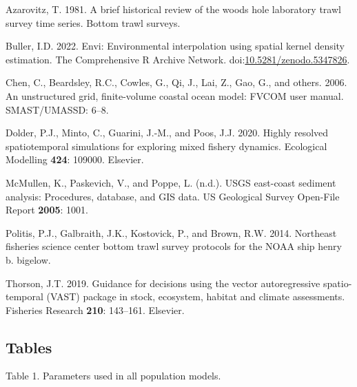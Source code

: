 \documentclass[
  12pt,
]{article}
\newlength{\cslhangindent}
\newlength{\cslentryspacingunit} %
\newenvironment{CSLReferences}[2] %
 {%
  \setlength{\parindent}{0pt}
  \ifodd #1
  \let\oldpar\par
  \def\par{\hangindent=\cslhangindent\oldpar}
  \fi
  \setlength{\parskip}{#2\cslentryspacingunit}
 }%
 {}
\begin{document}
\hypertarget{refs}{}
\begin{CSLReferences}{1}{0}
\leavevmode{}%
Azarovitz, T. 1981. A brief historical review of the woods hole laboratory trawl survey time series. Bottom trawl surveys.

\leavevmode{}%
Buller, I.D. 2022. Envi: Environmental interpolation using spatial kernel density estimation. The Comprehensive R Archive Network. doi:\href{https://doi.org/10.5281/zenodo.5347826}{10.5281/zenodo.5347826}.

\leavevmode{}%
Chen, C., Beardsley, R.C., Cowles, G., Qi, J., Lai, Z., Gao, G., and others. 2006. An unstructured grid, finite-volume coastal ocean model: FVCOM user manual. SMAST/UMASSD: 6--8.

\leavevmode{}%
Dolder, P.J., Minto, C., Guarini, J.-M., and Poos, J.J. 2020. Highly resolved spatiotemporal simulations for exploring mixed fishery dynamics. Ecological Modelling \textbf{424}: 109000. Elsevier.

\leavevmode{}%
McMullen, K., Paskevich, V., and Poppe, L. (n.d.). USGS east-coast sediment analysis: Procedures, database, and GIS data. US Geological Survey Open-File Report \textbf{2005}: 1001.

\leavevmode{}%
Politis, P.J., Galbraith, J.K., Kostovick, P., and Brown, R.W. 2014. Northeast fisheries science center bottom trawl survey protocols for the NOAA ship henry b. bigelow.

\leavevmode{}%
Thorson, J.T. 2019. Guidance for decisions using the vector autoregressive spatio-temporal (VAST) package in stock, ecosystem, habitat and climate assessments. Fisheries Research \textbf{210}: 143--161. Elsevier.

\end{CSLReferences}

\pagebreak

\hypertarget{tables}{%
\subsection{Tables}\label{tables}}

\pagebreak

Table 1. Parameters used in all population models.
\end{document}

